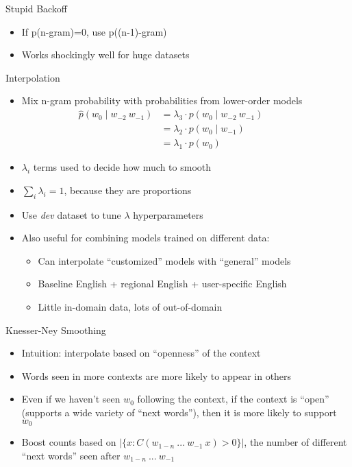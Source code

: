 \documentclass[11pt,letterpaper]{article}
\begin{document}
Stupid Backoff

\begin{itemize}
  \item If p(n-gram)=0, use p((n-1)-gram)
  \item Works shockingly well for huge datasets
\end{itemize}


Interpolation

\begin{itemize}
  \item Mix n-gram probability with probabilities from lower-order models
    \begin{align*}
      \hat{p}(w_0 \mid w_{-2}~w_{-1}) &= \lambda_3 \cdot p(w_0 \mid w_{-2}~w_{-1}) &&&& \\
                                      &= \lambda_2 \cdot p(w_0 \mid w_{-1}) \\
                                      &= \lambda_1 \cdot p(w_0)
    \end{align*}
  \item $\lambda_i$ terms used to decide how much to smooth
  \item $\sum_i \lambda_i = 1$, because they are proportions
  \item Use \textit{dev} dataset to tune $\lambda$ hyperparameters
  \item Also useful for combining models trained on different data:
  \begin{itemize}
    \item Can interpolate ``customized'' models with ``general'' models
    \item Baseline English + regional English + user-specific English
    \item Little in-domain data, lots of out-of-domain
  \end{itemize}
\end{itemize}


Knesser-Ney Smoothing

\begin{itemize}
  \item Intuition: interpolate based on ``openness'' of the context
  \item Words seen in more contexts are more likely to appear in others
  \item Even if we haven't seen $w_0$ following the context, if the context is ``open'' (supports a wide variety of ``next words''), then it is more likely to support $w_0$
  \item Boost counts based on $|\{x : C(w_{1-n}~...~w_{-1}~x)>0\}|$, the number of different ``next words'' seen after $w_{1-n}~...~w_{-1}$
\end{itemize}
\end{document}
